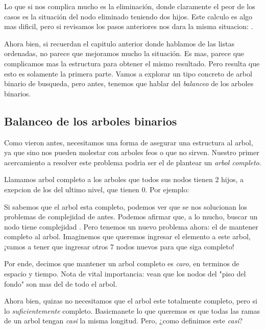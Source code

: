 \documentclass{article}
\begin{document}
Lo que si nos complica mucho es la eliminación, donde claramente el peor de los casos es la situación del nodo eliminado teniendo dos hijos. Este calculo es algo mas dificil, pero si revisamos los pasos anteriores nos dara la misma situacion: .

Ahora bien, si recuerdan el capitulo anterior donde hablamos de las listas ordenadas, no parece que mejoramos mucho la situación. Es mas, parece que complicamos mas la estructura para obtener el mismo resultado. Pero resulta que esto es solamente la primera parte. Vamos a explorar un tipo concreto de arbol binario de busqueda, pero antes, tenemos que hablar del \textit{balanceo} de los arboles binarios.

\subsection{Balanceo de los arboles binarios}

Como vieron antes, necesitamos una forma de asegurar una estructura al arbol, ya que sino nos pueden molestar con arboles feos o que no sirven. Nuestro primer acercamiento a resolver este problema podria ser el de plantear un \textit{arbol completo}.

Llamamos arbol completo a los arboles que todos sus nodos tienen 2 hijos, a exepcion de los del ultimo nivel, que tienen 0. Por ejemplo:

\begin{multicols}{2}

Si sabemos que el arbol esta completo, podemos ver que se nos solucionan los problemas de complejidad de antes. Podemos afirmar que, a lo mucho, buscar un nodo tiene complejidad . Pero tenemos un nuevo problema ahora: el de mantener completo al arbol. Imaginemos que queremos ingresar el elemento  a este arbol, ¡vamos a tener que ingresar otros 7 nodos nuevos para que siga completo!
\end{multicols}

Por ende, decimos que mantener un arbol completo es \textit{caro}, en terminos de espacio y tiempo. Nota de vital importancia: vean que los nodos del "piso del fondo" son mas del  de todo el arbol.

Ahora bien, quizas no necesitamos que el arbol este totalmente completo, pero si lo \textit{suficientemente} completo. Basicmanete lo que queremos es que todas las ramas de un arbol tengan \textit{casi} la misma longitud. Pero, ¿como definimos este \textit{casi}?
\end{document}
